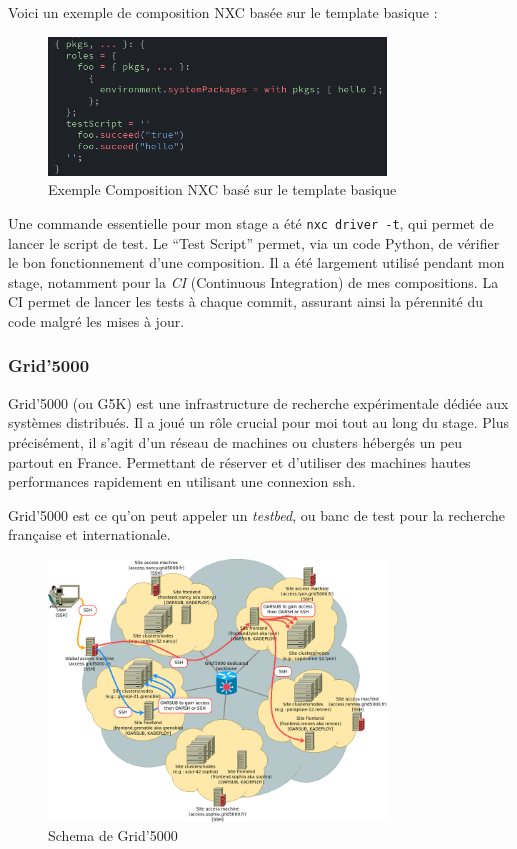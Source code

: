 \documentclass[a4paper,french,12pt, titlepage]{article}
\begin{document}
Voici un exemple de composition NXC basée sur le template basique :

\begin{figure}[h]
\centering
\includegraphics[width=0.8\textwidth,height=0.8\textheight,keepaspectratio]{images/template-hellow.png}
\caption{Exemple Composition NXC basé sur le template basique}
\end{figure}

Une commande essentielle pour mon stage a été \texttt{nxc\ driver\ -t},
qui permet de lancer le script de test. Le ``Test Script'' permet, via
un code Python, de vérifier le bon fonctionnement d'une composition. Il
a été largement utilisé pendant mon stage, notamment pour la \emph{CI}
(Continuous Integration) de mes compositions. La CI permet de lancer les
tests à chaque commit, assurant ainsi la pérennité du code malgré les
mises à jour.\newline

\hypertarget{grid5000}{%
\subsubsection{Grid'5000}\label{grid5000}}

Grid'5000 (ou G5K) est une infrastructure de recherche expérimentale
dédiée aux systèmes distribués. Il a joué un rôle crucial pour moi tout
au long du stage. Plus précisément, il s'agit d'un réseau de machines ou
clusters hébergés un peu partout en France. Permettant de réserver et
d'utiliser des machines hautes performances rapidement en utilisant une
connexion ssh.

Grid'5000 est ce qu'on peut appeler un \emph{testbed}, ou banc de test
pour la recherche française et internationale.\newline

\begin{figure}[h]
\centering
\includegraphics[width=0.8\textwidth,height=0.8\textheight,keepaspectratio]{images/shemag5k.png}
\caption{Schema de Grid'5000}
\end{figure}
\end{document}
